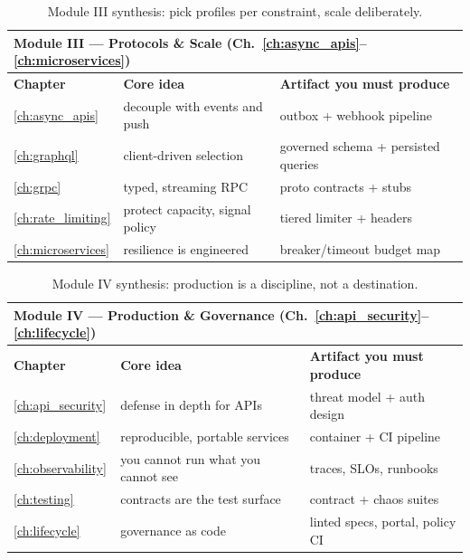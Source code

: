 \begin{table}[htbp]
  \centering
  \small
  \begin{tabularx}{\textwidth}{l X X}
    \toprule
    \multicolumn{3}{l}{\textbf{Module III --- Protocols \& Scale (Ch.~\ref{ch:async_apis}--\ref{ch:microservices})}} \\
    \midrule
    \textbf{Chapter} & \textbf{Core idea} & \textbf{Artifact you must produce} \\
    \midrule
    \ref{ch:async_apis} & decouple with events and push \cite{asyncapi} & outbox + webhook pipeline \\
    \ref{ch:graphql} & client-driven selection \cite{graphqlspec} & governed schema + persisted queries \\
    \ref{ch:grpc} & typed, streaming RPC \cite{grpcdocs,protobufdocs} & proto contracts + stubs \\
    \ref{ch:rate_limiting} & protect capacity, signal policy \cite{ietf_ratelimit_headers} & tiered limiter + headers \\
    \ref{ch:microservices} & resilience is engineered \cite{nygard2018releaseit,newman2021microservices} & breaker/timeout budget map \\
    \bottomrule
  \end{tabularx}
  \caption{Module III synthesis: pick profiles per constraint, scale
  deliberately.}
  \label{tab:module3}
\end{table}

\begin{table}[htbp]
  \centering
  \small
  \begin{tabularx}{\textwidth}{l X X}
    \toprule
    \multicolumn{3}{l}{\textbf{Module IV --- Production \& Governance (Ch.~\ref{ch:api_security}--\ref{ch:lifecycle})}} \\
    \midrule
    \textbf{Chapter} & \textbf{Core idea} & \textbf{Artifact you must produce} \\
    \midrule
    \ref{ch:api_security} & defense in depth for APIs \cite{owaspapisecurity,rfc6749,rfc7519} & threat model + auth design \\
    \ref{ch:deployment} & reproducible, portable services \cite{twelvefactor} & container + CI pipeline \\
    \ref{ch:observability} & you cannot run what you cannot see \cite{opentelemetrydocs,beyer2016sre} & traces, SLOs, runbooks \\
    \ref{ch:testing} & contracts are the test surface \cite{pactdocs} & contract + chaos suites \\
    \ref{ch:lifecycle} & governance as code \cite{openapi31,gehl2021apidesign} & linted specs, portal, policy CI \\
    \bottomrule
  \end{tabularx}
  \caption{Module IV synthesis: production is a discipline, not a
  destination.}
  \label{tab:module4}
\end{table}

